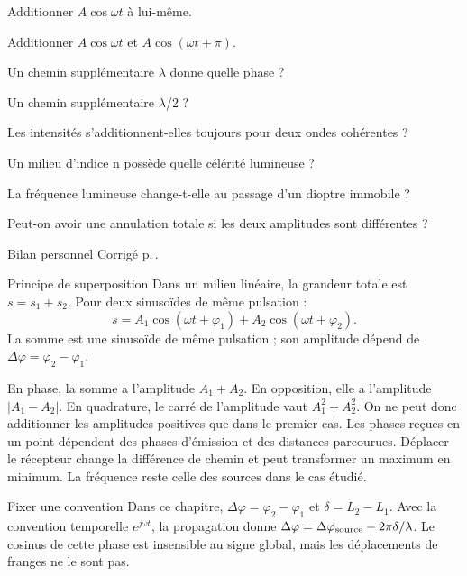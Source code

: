 
\begin{questions}
\item Additionner $A\cos\omega t$ à lui-même.
\item Additionner $A\cos\omega t$ et $A\cos(\omega t+\pi)$.
\item Un chemin supplémentaire \ensuremath{\lambda} donne quelle phase ?
\item Un chemin supplémentaire \ensuremath{\lambda}/2 ?
\item Les intensités s’additionnent-elles toujours pour deux ondes cohérentes ?
\item Un milieu d’indice n possède quelle célérité lumineuse ?
\item La fréquence lumineuse change-t-elle au passage d’un dioptre immobile ?
\item Peut-on avoir une annulation totale si les deux amplitudes sont différentes ?
\end{questions}
\begin{docu}{Bilan personnel}
Corrigé p.\,\pageref{corr-diag}.
\end{docu}


\begin{loi}{Principe de superposition}
Dans un milieu linéaire, la grandeur totale est $s=s_1+s_2$. Pour deux sinusoïdes de même pulsation :\[s=A_1\cos(\omega t+\varphi_1)+A_2\cos(\omega t+\varphi_2).\]La somme est une sinusoïde de même pulsation ; son amplitude dépend de $\Delta\varphi=\varphi_2-\varphi_1$.
\end{loi}
En phase, la somme a l’amplitude $A_1+A_2$. En opposition, elle a l’amplitude $|A_1-A_2|$. En quadrature, le carré de l’amplitude vaut $A_1^2+A_2^2$. On ne peut donc additionner les amplitudes positives que dans le premier cas.
Les phases reçues en un point dépendent des phases d’émission et des distances parcourues. Déplacer le récepteur change la différence de chemin et peut transformer un maximum en minimum. La fréquence reste celle des sources dans le cas étudié.
\begin{methode}{Fixer une convention}
Dans ce chapitre, $\Delta\varphi=\varphi_2-\varphi_1$ et $\delta=L_2-L_1$. Avec la convention temporelle $e^{j\omega t}$, la propagation donne $\Delta\varphi=\Delta\varphi_{\rm source}-2\pi\delta/\lambda$. Le cosinus de cette phase est insensible au signe global, mais les déplacements de franges ne le sont pas.
\end{methode}



